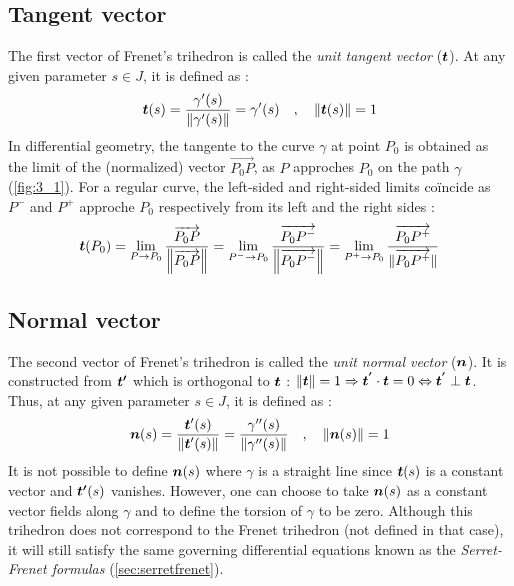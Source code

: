 \subsection{Tangent vector}
The first vector of Frenet's trihedron is called the \emph{unit tangent vector} ($\boldsymbol{t}$). At any given parameter $s \in J$,  it is defined as :
\begin{equation}
	\boldsymbol{t}(s) = \frac{\gamma'(s)}{\|\gamma'(s)\|} = \gamma'(s)
	\quad,\quad
	\|\boldsymbol{t}(s)\|=1
\end{equation}
In differential geometry, the tangente to the curve $\gamma$ at point $P_0$ is obtained as the limit of the (normalized) vector $\overrightarrow{P_0 P}$, as $P$ approches $P_0$ on the path $\gamma$ (\cref{fig:3_1}). For a regular curve, the left-sided and right-sided limits coïncide as $P^-$ and $P^+$ approche $P_0$ respectively from its left and the right sides :
\begin{equation}
	\boldsymbol{t}(P_0)
	= \lim_{P \to P_0}\frac{\overrightarrow{P_0 P}}{\left\|\overrightarrow{P_0 P}\right\|}
	= \lim_{P^- \to P_0}\frac{\overrightarrow{P_0 P^-}}{\left\|\overrightarrow{P_0 P^-}\right\|}
	= \lim_{P^+ \to P_0}\frac{\overrightarrow{P_0 P^+}}{\|\overrightarrow{P_0 P^+}\|}
\label{eq:3_4}
\end{equation}

\subsection{Normal vector}
The second vector of Frenet's trihedron is called the \emph{unit normal vector} ($\boldsymbol{n}$). It is constructed from $\boldsymbol{t'}$ which is orthogonal to $\boldsymbol{t}$ : $\|\boldsymbol{t}\|=1 \Rightarrow \boldsymbol{t^{'}} \cdot  \boldsymbol{t} = 0 \Leftrightarrow  \boldsymbol{t^{'}} \perp \boldsymbol{t}$. Thus, at any given parameter $s \in J$, it is defined as :
\begin{equation}
	\boldsymbol{n}(s) = \frac{\boldsymbol{t}'(s)}{\|\boldsymbol{t}'(s)\|} = \frac{\gamma''(s)}{\|\gamma''(s)\|}
	\quad,\quad
	\|\boldsymbol{n}(s)\|=1
\end{equation}
It is not possible to define $\boldsymbol{n}(s)$ where $\gamma$ is a straight line since $\boldsymbol{t}(s)$ is a constant vector and $\boldsymbol{t'}(s)$ vanishes. However, one can choose to take $\boldsymbol{n}(s)$ as a constant vector fields along $\gamma$ and to define the torsion of $\gamma$ to be zero. Although this trihedron does not correspond to the Frenet trihedron (not defined in that case), it will still satisfy the same governing differential equations known as the \emph{Serret-Frenet formulas} (\cref{sec:serretfrenet}).

